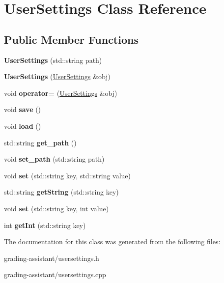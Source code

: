\hypertarget{class_user_settings}{}\section{User\+Settings Class Reference}
\label{class_user_settings}
\subsection*{Public Member Functions}
\begin{DoxyCompactItemize}
\item 
\mbox{\label{class_user_settings_ab8ce58827355048f7b397d95c3d3d421}} 
{\bfseries User\+Settings} (std\+::string path)
\item 
\mbox{\label{class_user_settings_afa1dddce37e80cdd7444a22716ed11fd}} 
{\bfseries User\+Settings} (\hyperlink{class_user_settings}{User\+Settings} \&obj)
\item 
\mbox{\label{class_user_settings_a3dcfa0b162d84538de39e8f03267858a}} 
void {\bfseries operator=} (\hyperlink{class_user_settings}{User\+Settings} \&obj)
\item 
\mbox{\label{class_user_settings_af6354aa4cad29e254e7acce48425f9ba}} 
void {\bfseries save} ()
\item 
\mbox{\label{class_user_settings_a893482525be333465128a6896593e651}} 
void {\bfseries load} ()
\item 
\mbox{\label{class_user_settings_a8b3bc0132ec9dbc8a8bb5f91194a9593}} 
std\+::string {\bfseries get\+\_\+path} ()
\item 
\mbox{\label{class_user_settings_ab45dc788b479df11ce40414333f8e7c8}} 
void {\bfseries set\+\_\+path} (std\+::string path)
\item 
\mbox{\label{class_user_settings_a9c74c02c3b62d39f4733f9e2bb7ea71d}} 
void {\bfseries set} (std\+::string key, std\+::string value)
\item 
\mbox{\label{class_user_settings_ac963d1939ddf67ac594e31f8cd63a183}} 
std\+::string {\bfseries get\+String} (std\+::string key)
\item 
\mbox{\label{class_user_settings_a087db56471b446fd4fddf1a0e2c8be1a}} 
void {\bfseries set} (std\+::string key, int value)
\item 
\mbox{\label{class_user_settings_a90d70b27fcf3f9c611c9db108edd18e5}} 
int {\bfseries get\+Int} (std\+::string key)
\end{DoxyCompactItemize}


The documentation for this class was generated from the following files\+:\begin{DoxyCompactItemize}
\item 
grading-\/assistant/usersettings.\+h\item 
grading-\/assistant/usersettings.\+cpp\end{DoxyCompactItemize}
